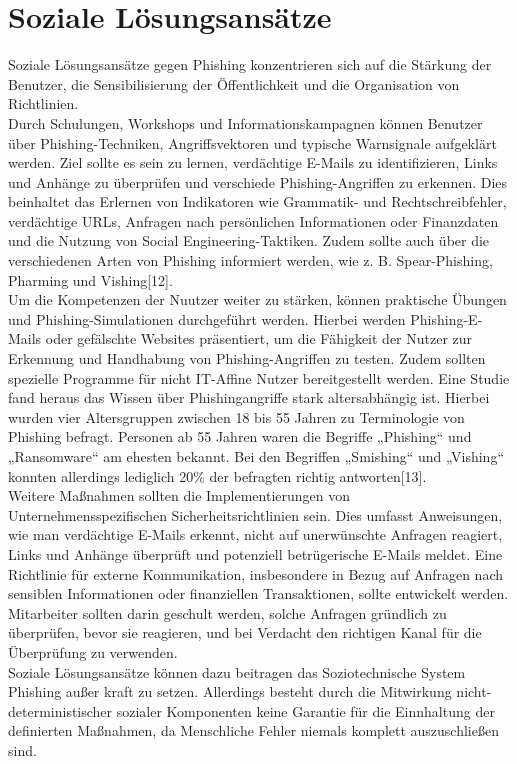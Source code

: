 \documentclass[journal=tosc,final]{iacrtrans}
\begin{document}
\section{Soziale Lösungsansätze}
Soziale Lösungsansätze gegen Phishing konzentrieren sich auf die Stärkung der Benutzer, die Sensibilisierung der Öffentlichkeit und die Organisation von Richtlinien.\\
Durch Schulungen, Workshops und Informationskampagnen können Benutzer über Phishing-Techniken, Angriffsvektoren und typische Warnsignale aufgeklärt werden. Ziel sollte es sein zu lernen, verdächtige E-Mails zu identifizieren, Links und Anhänge zu überprüfen und verschiede Phishing-Angriffen zu erkennen. Dies beinhaltet das Erlernen von Indikatoren wie Grammatik- und Rechtschreibfehler, verdächtige URLs, Anfragen nach persönlichen Informationen oder Finanzdaten und die Nutzung von Social Engineering-Taktiken. Zudem sollte auch über die verschiedenen Arten von Phishing informiert werden, wie z. B. Spear-Phishing, Pharming und Vishing[12].\\ Um die Kompetenzen der Nuutzer weiter zu stärken, können praktische Übungen und Phishing-Simulationen durchgeführt werden. Hierbei werden  Phishing-E-Mails oder gefälschte Websites präsentiert, um die Fähigkeit der Nutzer zur Erkennung und Handhabung von Phishing-Angriffen zu testen. Zudem sollten spezielle Programme für nicht IT-Affine Nutzer bereitgestellt werden. Eine Studie fand heraus das Wissen über Phishingangriffe stark altersabhängig ist. Hierbei wurden vier Altersgruppen zwischen 18 bis 55 Jahren zu Terminologie von Phishing befragt. Personen ab 55 Jahren waren die Begriffe „Phishing“ und „Ransomware“ am ehesten bekannt. Bei den Begriffen „Smishing“ und „Vishing“ konnten allerdings lediglich 20\% der befragten richtig antworten[13].\\
Weitere Maßnahmen sollten die Implementierungen von Unternehmensspezifischen Sicherheitsrichtlinien sein. Dies umfasst Anweisungen, wie man verdächtige E-Mails erkennt, nicht auf unerwünschte Anfragen reagiert, Links und Anhänge überprüft und potenziell betrügerische E-Mails meldet. Eine Richtlinie für externe Kommunikation, insbesondere in Bezug auf Anfragen nach sensiblen Informationen oder finanziellen Transaktionen, sollte entwickelt werden. Mitarbeiter sollten darin geschult werden, solche Anfragen gründlich zu überprüfen, bevor sie reagieren, und bei Verdacht den richtigen Kanal für die Überprüfung zu verwenden.\\
Soziale Lösungsansätze können dazu beitragen das Soziotechnische System Phishing außer kraft zu setzen. Allerdings besteht durch die Mitwirkung nicht-deterministischer sozialer Komponenten  keine Garantie für die Einnhaltung der definierten Maßnahmen, da Menschliche Fehler niemals komplett auszuschließen sind.
\end{document}
